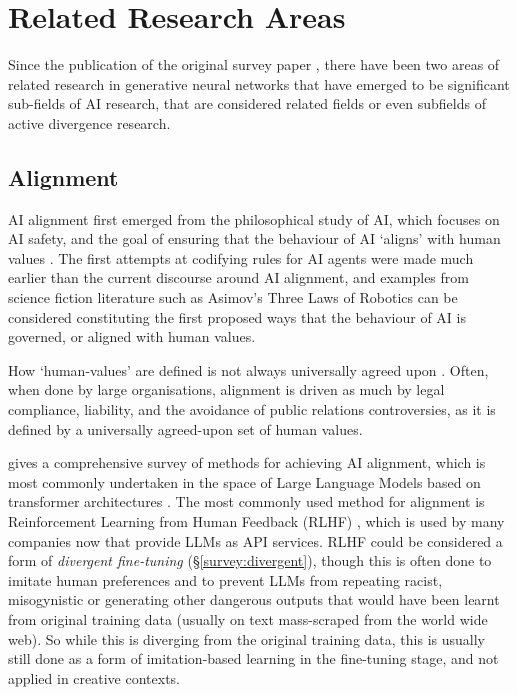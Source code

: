 \section{Related Research Areas}
\label{c6:sec:related-research}

Since the publication of the original survey paper \citep{broad2021active}, there have been two areas of related research in generative neural networks that have emerged to be significant sub-fields of AI research, that are considered related fields or even subfields of active divergence research. 

\subsection{Alignment}
\label{c6:subsec:alignment}

AI alignment first emerged from the philosophical study of AI, which focuses on AI safety, and the goal of ensuring that the behaviour of AI `aligns' with human values \citep{yudkowsky2016ai, gabriel2020artificial}. 
The first attempts at codifying rules for AI agents were made much earlier than the current discourse around AI alignment, and examples from science fiction literature such as Asimov's Three Laws of Robotics \citep{asimov1942runaround} can be considered constituting the first proposed ways that the behaviour of AI is governed, or aligned with human values. 

How `human-values' are defined is not always universally agreed upon \citep{turchin2019ai}. 
Often, when done by large organisations, alignment is driven as much by legal compliance, liability, and the avoidance of public relations controversies, as it is defined by a universally agreed-upon set of human values. 

\cite{ji2023ai} gives a comprehensive survey of methods for achieving AI alignment, which is most commonly undertaken in the space of Large Language Models based on transformer architectures \citep{vaswani2017attention}. 
The most commonly used method for alignment is Reinforcement Learning from Human Feedback (RLHF) \citep{ziegler2019fine}, which is used by many companies now that provide LLMs as API services. 
RLHF could be considered a form of \textit{divergent fine-tuning} (\S \ref{survey:divergent}), though this is often done to imitate human preferences and to prevent LLMs from repeating racist, misogynistic or generating other dangerous outputs that would have been learnt from original training data (usually on text mass-scraped from the world wide web).
So while this is diverging from the original training data, this is usually still done as a form of imitation-based learning in the fine-tuning stage, and not applied in creative contexts.

